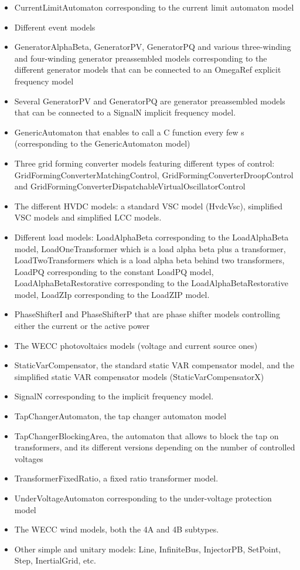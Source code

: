 \documentclass[a4paper, 12pt]{report}
\begin{document}
\begin{itemize}
\item CurrentLimitAutomaton corresponding to the current limit automaton model
\item Different event models
\item GeneratorAlphaBeta, GeneratorPV, GeneratorPQ and various three-winding and four-winding generator preassembled models corresponding to the different generator models that can be connected to an OmegaRef explicit frequency model
\item Several GeneratorPV and GeneratorPQ are generator preassembled models that can be connected to a SignalN implicit frequency model.
\item GenericAutomaton that enables to call a C function every few s (corresponding to the GenericAutomaton model)
\item Three grid forming converter models featuring different types of control: GridFormingConverterMatchingControl, GridFormingConverterDroopControl and GridFormingConverterDispatchableVirtualOscillatorControl
\item The different HVDC models: a standard VSC model (HvdcVsc), simplified VSC models and simplified LCC models.
\item Different load models: LoadAlphaBeta corresponding to the LoadAlphaBeta model, LoadOneTransformer which is a load alpha beta plus a transformer, LoadTwoTransformers which is a load alpha beta behind two transformers, LoadPQ corresponding to the constant LoadPQ model, LoadAlphaBetaRestorative corresponding to the LoadAlphaBetaRestorative model, LoadZIp corresponding to the LoadZIP model.
\item PhaseShifterI and PhaseShifterP that are phase shifter models controlling either the current or the active power
\item The \ac{WECC} photovoltaics models (voltage and current source ones)
\item StaticVarCompensator, the standard static VAR compensator model, and the simplified static VAR compensator models (StaticVarCompensatorX)
\item SignalN corresponding to the implicit frequency model.
\item TapChangerAutomaton, the tap changer automaton model
\item TapChangerBlockingArea, the automaton that allows to block the tap on transformers, and its different versions depending on the number of controlled voltages
\item TransformerFixedRatio, a fixed ratio transformer model.
\item UnderVoltageAutomaton corresponding to the under-voltage protection model
\item The \ac{WECC} wind models, both the 4A and 4B subtypes.
\item Other simple and unitary models: Line, InfiniteBus, InjectorPB, SetPoint, Step, InertialGrid, etc.
\end{itemize}
\end{document}
